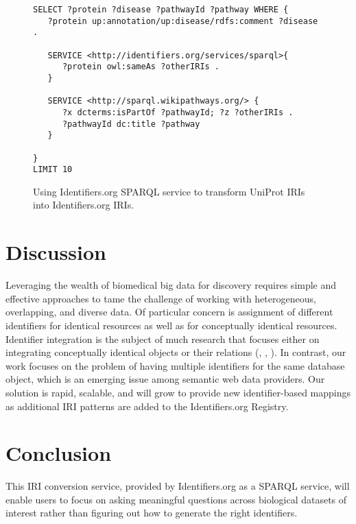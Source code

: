 \documentclass{bioinfo}
\begin{document}
\begin{figure}[h]
{\scriptsize
\begin{verbatim}		
SELECT ?protein ?disease ?pathwayId ?pathway WHERE {
   ?protein up:annotation/up:disease/rdfs:comment ?disease .
   
   SERVICE <http://identifiers.org/services/sparql>{
      ?protein owl:sameAs ?otherIRIs .
   }
   
   SERVICE <http://sparql.wikipathways.org/> {
      ?x dcterms:isPartOf ?pathwayId; ?z ?otherIRIs .
      ?pathwayId dc:title ?pathway
   }

}
LIMIT 10
\end{verbatim}
}
\caption{Using Identifiers.org SPARQL service to transform UniProt IRIs into Identifiers.org IRIs.}
\label{example2}
\end{figure}
    
\section{Discussion}
Leveraging the wealth of biomedical big data for discovery requires simple and effective approaches to tame the challenge of working with heterogeneous, overlapping, and diverse data. Of particular concern is assignment of different identifiers for identical resources as well as for conceptually identical resources. Identifier integration is the subject of much research that focuses either on integrating conceptually identical objects or their relations (\cite{VanIersel2010}, \cite{Wein2012}, \cite{Chambers2013}). In contrast, our work focuses on the problem of having multiple identifiers for the same database object, which is an emerging issue among semantic web data providers. Our solution is rapid, scalable, and will grow to provide new identifier-based mappings as additional IRI patterns are added to the Identifiers.org Registry. 

\section{Conclusion}
This IRI conversion service, provided by Identifiers.org as a SPARQL service, will enable users to focus on asking meaningful questions across biological datasets of interest rather than figuring out how to generate the right identifiers. 
\end{document}
